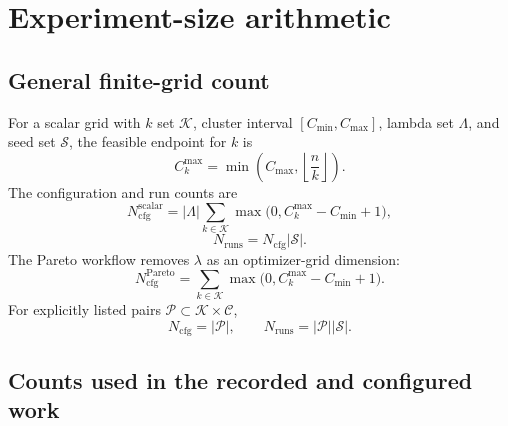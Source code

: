 \documentclass[11pt,a4paper]{article}
\newcommand{\card}[1]{\left\lvert #1\right\rvert}
\begin{document}
\section{Experiment-size arithmetic}

\subsection{General finite-grid count}

For a scalar grid with $k$ set $\mathcal K$, cluster interval
$[C_{\min},C_{\max}]$, lambda set $\Lambda$, and seed set $\mathcal S$, the
feasible endpoint for $k$ is
\begin{equation}
C_k^{\max}=\min\!\left(C_{\max},\left\lfloor\frac nk\right\rfloor\right).
\tag{107}
\end{equation}
The configuration and run counts are
\begin{equation}
N_{\mathrm{cfg}}^{\mathrm{scalar}}
=\card{\Lambda}\sum_{k\in\mathcal K}
\max\bigl(0,C_k^{\max}-C_{\min}+1\bigr),
\tag{108}
\end{equation}
\begin{equation}
N_{\mathrm{runs}}=N_{\mathrm{cfg}}\card{\mathcal S}.
\tag{109}
\end{equation}
The Pareto workflow removes $\lambda$ as an optimizer-grid dimension:
\begin{equation}
N_{\mathrm{cfg}}^{\mathrm{Pareto}}
=\sum_{k\in\mathcal K}
\max\bigl(0,C_k^{\max}-C_{\min}+1\bigr).
\tag{110}
\end{equation}
For explicitly listed pairs $\mathcal P\subset\mathcal K\times\mathcal C$,
\begin{equation}
N_{\mathrm{cfg}}=\card{\mathcal P},
\qquad
N_{\mathrm{runs}}=\card{\mathcal P}\card{\mathcal S}.
\tag{111}
\end{equation}

\subsection{Counts used in the recorded and configured work}
\end{document}
